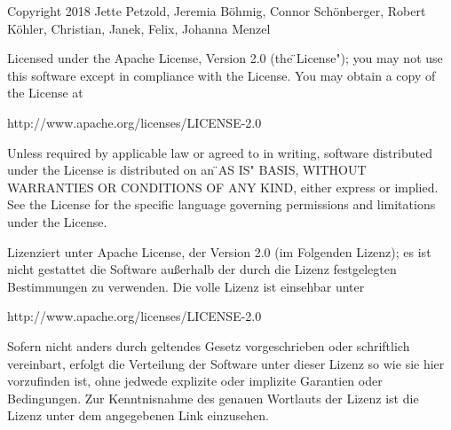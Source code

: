 \begin{tcolorbox}
Copyright 2018 Jette Petzold, Jeremia B\"{o}hmig, Connor Sch\"{o}nberger, Robert K\"{o}hler, Christian, Janek, Felix, Johanna Menzel

Licensed under the Apache License, Version 2.0 (the \"{}License");
you may not use this software except in compliance with the License.
You may obtain a copy of the License at

http://www.apache.org/licenses/LICENSE-2.0

Unless required by applicable law or agreed to in writing, software
distributed under the License is distributed on an \"{}AS IS" BASIS,
WITHOUT WARRANTIES OR CONDITIONS OF ANY KIND, either express or implied.
See the License for the specific language governing permissions and
limitations under the License.

Lizenziert unter Apache License, der Version 2.0 (im Folgenden Lizenz); es ist nicht gestattet die Software außerhalb der durch die Lizenz festgelegten Bestimmungen zu verwenden.
Die volle Lizenz ist einsehbar unter

http://www.apache.org/licenses/LICENSE-2.0

Sofern nicht anders durch geltendes Gesetz vorgeschrieben oder schriftlich vereinbart, erfolgt die Verteilung der Software unter dieser Lizenz so wie sie hier vorzufinden ist, ohne jedwede explizite oder implizite Garantien oder Bedingungen.
Zur Kenntnisnahme des genauen Wortlauts der Lizenz ist die Lizenz unter dem angegebenen Link einzusehen.

\end{tcolorbox}